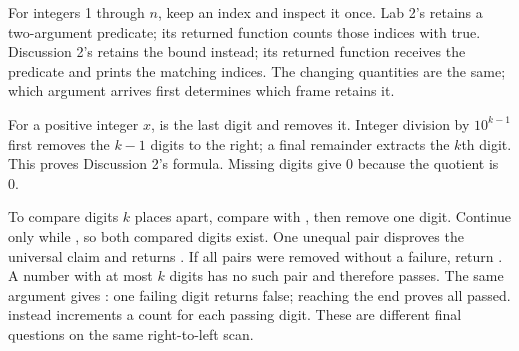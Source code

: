 \documentclass[10pt]{scrartcl}
\begin{document}
For integers 1 through $n$, keep an index  and inspect it once. Lab 2's  retains a two-argument predicate; its returned function counts those indices with  true. Discussion 2's  retains the bound instead; its returned function receives the predicate and prints the matching indices. The changing quantities are the same; which argument arrives first determines which frame retains it.

For a positive integer $x$,  is the last digit and  removes it. Integer division by $10^{k-1}$ first removes the $k-1$ digits to the right; a final remainder extracts the $k$th digit. This proves Discussion 2's  formula. Missing digits give 0 because the quotient is 0.
\begin{fig}
\end{fig}
\par\noindent\begin{minipage}{\linewidth}
\begin{steps}
\ii To compare digits $k$ places apart, compare  with , then remove one digit. Continue only while , so both compared digits exist.
\ii One unequal pair disproves the universal claim and returns . If all pairs were removed without a failure, return . A number with at most $k$ digits has no such pair and therefore passes.
\ii The same argument gives : one failing digit returns false; reaching the end proves all passed.  instead increments a count for each passing digit. These are different final questions on the same right-to-left scan.
\end{steps}
\end{minipage}\par
\end{document}
